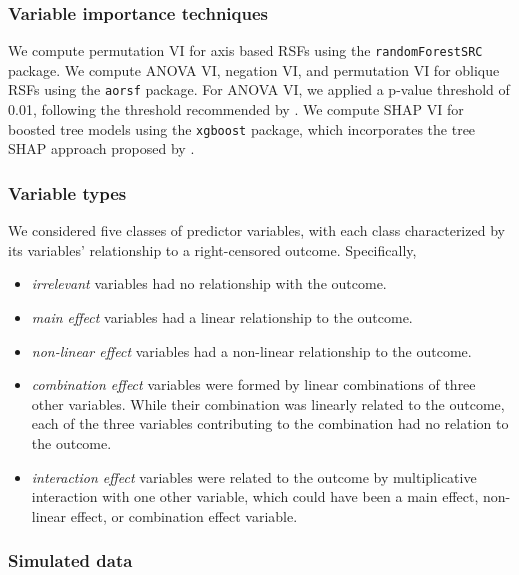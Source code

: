 \documentclass{article}\usepackage[]{graphicx}\usepackage[]{xcolor}
\begin{document}
\subsubsection{Variable importance techniques}

We compute permutation VI for axis based RSFs using the \texttt{randomForestSRC} package. We compute ANOVA VI, negation VI, and permutation VI for oblique RSFs using the \texttt{aorsf} package. For ANOVA VI, we applied a p-value threshold of 0.01, following the threshold recommended by \citet{menze2011oblique}. We compute SHAP VI for boosted tree models using the \texttt{xgboost} package, which incorporates the tree SHAP approach proposed by \citet{lundberg2018consistent}.


\subsubsection{Variable types}

We considered five classes of predictor variables, with each class characterized by its variables' relationship to a right-censored outcome. Specifically, \begin{itemize}
\item \textit{irrelevant} variables had no relationship with the outcome.
\item \textit{main effect} variables had a linear relationship to the outcome.
\item \textit{non-linear effect} variables had a non-linear relationship to the outcome.
\item \textit{combination effect} variables were formed by linear combinations of three other variables. While their combination was linearly related to the outcome, each of the three variables contributing to the combination had no relation to the outcome.
\item \textit{interaction effect} variables were related to the outcome by multiplicative interaction with one other variable, which could have been a main effect, non-linear effect, or combination effect variable.
\end{itemize}


\subsubsection{Simulated data}
\end{document}

